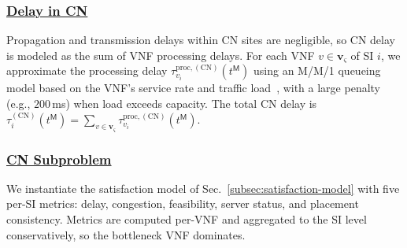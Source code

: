 \documentclass[12pt,lettersize,journal,onecolumn]{IEEEtran}
\begin{document}
\subsubsection{\underline{Delay in CN}} \label{cn-delay-subsection}
Propagation and transmission delays within CN sites are negligible, so CN delay is modeled as the sum of VNF processing delays. For each VNF $v\in\boldsymbol{v}_{\varsigma}$ of SI $i$, we approximate the processing delay $\tau^{\mathrm{proc,(CN)}}_{v_{i}}(t^\mathsf{M})$ using an M/M/1 queueing model based on the VNF's service rate and traffic load~\cite{tnse22zhang}, with a large penalty (e.g., $200$\,ms) when load exceeds capacity. The total CN delay is 
$\tau^{\mathrm{(CN)}}_{i}(t^\mathsf{M})=\sum_{v\in\boldsymbol{v}_{\varsigma}} \tau^{\mathrm{proc,(CN)}}_{v_{i}}(t^\mathsf{M}).$

\subsubsection{\underline{CN Subproblem}} \label{cn-problem-formulation}
We instantiate the satisfaction model of Sec.~\ref{subsec:satisfaction-model} with five per-SI metrics: delay, congestion, feasibility, server status, and placement consistency. Metrics are computed per-VNF and aggregated to the SI level conservatively, so the bottleneck VNF dominates.
\end{document}
